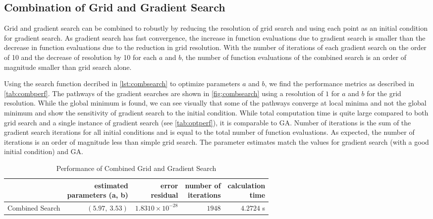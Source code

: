 \documentclass[11pt,a4paper]{article}
\begin{document}
\subsection{Combination of Grid and Gradient Search}
Grid and gradient search can be combined to robustly by reducing the resolution
of grid search and using each point as an initial condition for gradient
search. As gradient search has fast convergence, the increase in function
evaluations due to gradient search is smaller than the decrease in function
evaluations due to the reduction in grid resolution. With the number of
iterations of each gradient search on the order of 10 and the decrease of
resolution by 10 for each $a$ and $b$, the number of function evaluations of
the combined search is an order of magnitude smaller than grid search alone.

Using the search function decribed in \autoref{lst:combsearch} to optimize
parameters $a$ and $b$, we find the performance metrics as described in
\autoref{tab:combperf}. The pathways of the gradient searches are shown in
\autoref{fig:combsearch} using a resolution of $1$ for $a$ and $b$ for the grid
resolution. While the global minimum is found, we can see visually that some of
the pathways converge at local minima and not the global minimum and show the
sensitivity of gradient search to the initial condition. While total
computation time is quite large compared to both grid search and a single
instance of gradient search (see \autoref{tab:optperf}), it is comparable to
GA. Number of iterations is the sum of the gradient search iterations for all
initial conditions and is equal to the total number of function evaluations. As
expected, the number of iterations is an order of magnitude less than simple
grid search. The parameter estimates match the values for gradient search (with
a good initial condition) and GA.

\newpage
{}


\begin{table}
    \centering
    \begin{tabular}{|r|r|r|r|r|}
        \hline
        \nonumber & \shortstack[c]{estimated\\parameters (a, b)} &
            \shortstack[c]{error\\residual} &
            \shortstack[c]{number of\\iterations} &
            \shortstack[c]{calculation\\time} \\
        \hline
        Combined Search & $ (5.97,\: 3.53) $ & $ 1.8310 \times 10^{-28} $ &
            $ 1948 $ & $ 4.2724 $ s \\
        \hline
    \end{tabular}
    \caption{Performance of Combined Grid and Gradient Search}
    \label{tab:combperf}
\end{table}
\end{document}
